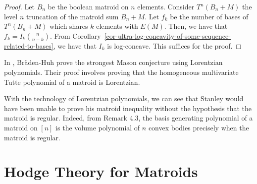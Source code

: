 \documentclass{puthesis-UG}
\begin{document}
\begin{proof}
	Let $B_n$ be the boolean matroid on $n$ elements. Consider $T^n (B_n + M)$ the level $n$ truncation of the matroid sum $B_n + M$. Let $f_k$ be the number of bases of $T^n(B_n + M)$ which shares $k$ elements with $E(M)$. Then, we have that $f_k = I_k \binom{n}{n-k}$. From Corollary~\ref{cor-ultra-log-concavity-of-some-sequence-related-to-bases}, we have that $I_k$ is log-concave. This suffices for the proof. 
\end{proof}

\begin{remark}
	In \cite{lorentzian-polynomials}, Br\"aden-Huh prove the strongest Mason conjecture using Lorentzian polynomials. Their proof involves proving that the homogeneous multivariate Tutte polynomial of a matroid is Lorentzian. 
\end{remark}

\begin{remark}
	With the technology of Lorentzian polynomials, we can see that Stanley would have been unable to prove his matroid inequality without the hypothesis that the matroid is regular. Indeed, from Remark 4.3, the basis generating polynomial of a matroid on $[n]$ is the volume polynomial of $n$ convex bodies precisely when the matroid is regular.
\end{remark}

\chapter{Hodge Theory for Matroids} \label{chap:hodge-theory-for-matroids}
\end{document}
